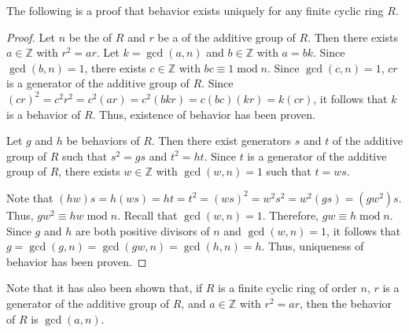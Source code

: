 \documentclass[12pt]{article}
\begin{document}

The following is a proof that behavior exists uniquely for any finite cyclic ring $R$.

\begin{proof}
Let $n$ be the  of $R$ and $r$ be a  of the additive group of $R$.  Then there exists $a \in \mathbb{Z}$ with $r^2=ar$.  Let $k=\gcd(a,n)$ and $b \in \mathbb{Z}$ with $a=bk$.  Since $\gcd(b,n)=1$, there exists $c \in \mathbb{Z}$ with $bc \equiv 1 \operatorname{mod} n$.  Since $\gcd(c,n)=1$, $cr$ is a generator of the additive group of $R$.  Since $(cr)^2=c^2r^2=c^2(ar)=c^2(bkr)=c(bc)(kr)=k(cr)$, it follows that $k$ is a behavior of $R$.  Thus, existence of behavior has been proven.

Let $g$ and $h$ be behaviors of $R$.  Then there exist generators $s$ and $t$ of the additive group of $R$ such that $s^2=gs$ and $t^2=ht$.  Since $t$ is a generator of the additive group of $R$, there exists $w \in \mathbb{Z}$ with $\gcd(w,n)=1$ such that $t=ws$.

Note that $(hw)s=h(ws)=ht=t^2=(ws)^2=w^2s^2=w^2(gs)=(gw^2)s$.  Thus, $gw^2 \equiv hw \operatorname{mod} n$.  Recall that $\gcd(w,n)=1$.  Therefore, $gw \equiv h \operatorname{mod} n$.  Since $g$ and $h$ are both positive divisors of $n$ and $\gcd(w,n)=1$, it follows that $g=\gcd(g,n)=\gcd(gw,n)=\gcd(h,n)=h$.  Thus, uniqueness of behavior has been proven.
\end{proof}

Note that it has also been shown that, if $R$ is a finite cyclic ring of order $n$, $r$ is a generator of the additive group of $R$, and $a \in \mathbb{Z}$ with $r^2=ar$, then the behavior of $R$ is $\gcd(a,n)$.
\end{document}
